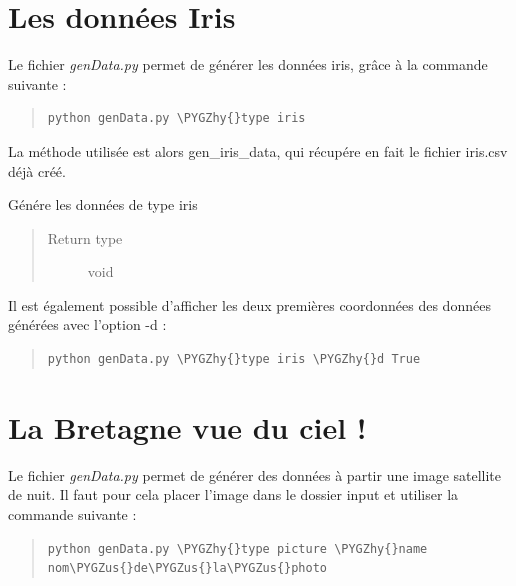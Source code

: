 \documentclass[letterpaper,10pt,english]{sphinxmanual}
\def\PYGZus{\char`\_}
\def\PYGZhy{\char`\-}
\begin{document}
\section{Les données Iris}
\label{iris:iris}\label{iris::doc}\label{iris:les-donnees-iris}
Le fichier \emph{genData.py} permet de générer les données iris, grâce à la commande suivante :
\begin{quote}

\begin{Verbatim}[commandchars=\\\{\}]
python genData.py \PYGZhy{}type iris
\end{Verbatim}
\end{quote}

La méthode utilisée est alors gen\_iris\_data, qui récupére en fait le fichier iris.csv déjà créé.

\begin{fulllineitems}
\label{iris:genData.gen_iris_data}
Génére les données de type iris
\begin{quote}\begin{description}
\item[{Return type}] \leavevmode
void

\end{description}\end{quote}

\end{fulllineitems}


Il est également possible d'afficher les deux premières coordonnées des données générées avec l'option -d :
\begin{quote}

\begin{Verbatim}[commandchars=\\\{\}]
python genData.py \PYGZhy{}type iris \PYGZhy{}d True
\end{Verbatim}
\end{quote}


\section{La Bretagne vue du ciel !}
\label{sky:la-bretagne-vue-du-ciel}\label{sky:sky}\label{sky::doc}
Le fichier \emph{genData.py} permet de générer des données à partir une image satellite de nuit.
Il faut pour cela placer l'image dans le dossier input et utiliser la commande suivante :
\begin{quote}

\begin{Verbatim}[commandchars=\\\{\}]
python genData.py \PYGZhy{}type picture \PYGZhy{}name nom\PYGZus{}de\PYGZus{}la\PYGZus{}photo
\end{Verbatim}
\end{quote}
\end{document}
